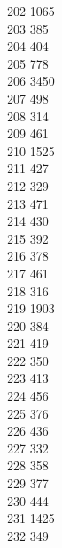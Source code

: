 { 202	1065 \\
 203	385 \\
 204	404 \\
 205	778 \\
 206	3450 \\
 207	498 \\
 208	314 \\
 209	461 \\
 210	1525 \\
 211	427 \\
 212	329 \\
 213	471 \\
 214	430 \\
 215	392 \\
 216	378 \\
 217	461 \\
 218	316 \\
 219	1903 \\
 220	384 \\
 221	419 \\
 222	350 \\
 223	413 \\
 224	456 \\
 225	376 \\
 226	436 \\
 227	332 \\
 228	358 \\
 229	377 \\
 230	444 \\
 231	1425 \\
 232	349 \\
}
